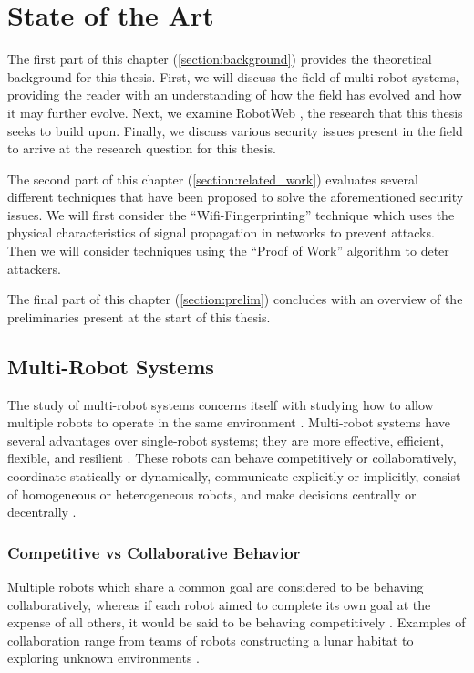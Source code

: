 \chapter{State of the Art}

The first part of this chapter (\autoref{section:background}) provides the theoretical background for this thesis. First, we will discuss the field of multi-robot systems, providing the reader with an understanding of how the field has evolved and how it may further evolve. Next, we examine RobotWeb \cite{Robotweb}, the research that this thesis seeks to build upon. Finally, we discuss various security issues present in the field to arrive at the research question for this thesis. 

The second part of this chapter (\autoref{section:related_work}) evaluates several different techniques that have been proposed to solve the aforementioned security issues. We will first consider the ``Wifi-Fingerprinting'' technique which uses the physical characteristics of signal propagation in networks to prevent attacks. Then we will consider techniques using the ``Proof of Work'' algorithm to deter attackers.

The final part of this chapter (\autoref{section:prelim}) concludes with an overview of the preliminaries present at the start of this thesis.

\section{Multi-Robot Systems} \label{section:background}
The study of multi-robot systems concerns itself with studying how to allow multiple robots to operate in the same environment \cite{MRS-Implicit-Explicit-Comms}. Multi-robot systems have several advantages over single-robot systems; they are more effective, efficient, flexible, and resilient \cite{MultiVsSingleRobotSystems}. These robots can behave competitively or collaboratively, coordinate statically or dynamically, communicate explicitly or implicitly, consist of homogeneous or heterogeneous robots, and make decisions centrally or decentrally \cite{MultiRobotCoordinationSurvey}.

\subsection{Competitive vs Collaborative Behavior}
Multiple robots which share a common goal are considered to be behaving collaboratively, whereas if each robot aimed to complete its own goal at the expense of all others, it would be said to be behaving competitively \cite{MultiRobotCoordinationSurvey}. Examples of collaboration range from teams of robots constructing a lunar habitat \cite{LunarHabitatConstructionExample} to exploring unknown environments \cite{MultiRobotExplorationExample}.

